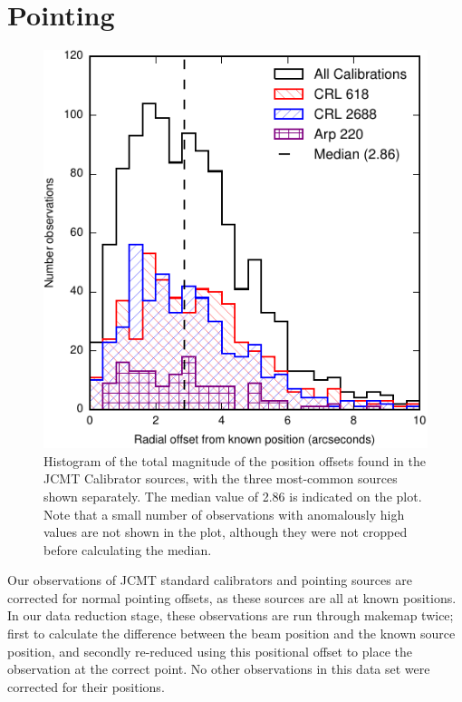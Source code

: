\documentclass[twocolumn,times]{aastex6}
\begin{document}
\section{Pointing}
\begin{figure}
  \centering
  \includegraphics{pointing-offsets-by-source.pdf}
  \caption{Histogram of the total magnitude of the position offsets
    found in the JCMT Calibrator sources, with the three most-common
    sources shown separately. The median value of 2.86\arcsec{} is
    indicated on the plot. Note that a small number of observations
    with anomalously high values are not shown in the plot, although
    they were not cropped before calculating the median.}
  \label{fig:pointing}
\end{figure}

Our observations of JCMT standard calibrators and pointing sources are
corrected for normal pointing offsets, as these sources are all at
known positions. In our data reduction stage, these observations are
run through makemap twice; first to calculate the difference between
the beam position and the known source position, and secondly
re-reduced using this positional offset to place the observation at
the correct point. No other observations in this data set were
corrected for their positions.
\end{document}
